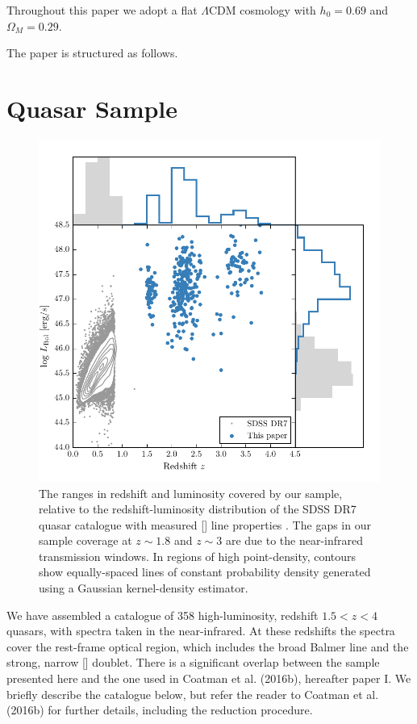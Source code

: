 Throughout this paper we adopt a flat $\Lambda$CDM cosmology with $h_0=0.69$ and $\Omega_M=0.29$. 

The paper is structured as follows. 

\section{Quasar Sample}

\begin{figure}
    \includegraphics[width=\columnwidth]{figures/chapter04/luminosity_z.pdf} 
    \caption{The ranges in redshift and luminosity covered by our sample, relative to the redshift-luminosity distribution of the SDSS DR7 quasar catalogue with measured [] line properties \citep{shen11}. The gaps in our sample coverage at $z\sim1.8$ and $z\sim3$ are due to the near-infrared transmission windows. In regions of high point-density, contours show equally-spaced lines of constant probability density generated using a Gaussian kernel-density estimator.}     
    \label{fig:lzplane}
\end{figure}

We have assembled a catalogue of 358 high-luminosity, redshift $1.5 < z < 4$ quasars, with spectra taken in the near-infrared.
At these redshifts the spectra cover the rest-frame optical region, which includes the broad Balmer \hb line and the strong, narrow [] doublet. 
There is a significant overlap between the sample presented here and the one used in Coatman et al. (2016b), hereafter paper I.  
We briefly describe the catalogue below, but refer the reader to Coatman et al. (2016b) for further details, including the reduction procedure.  

